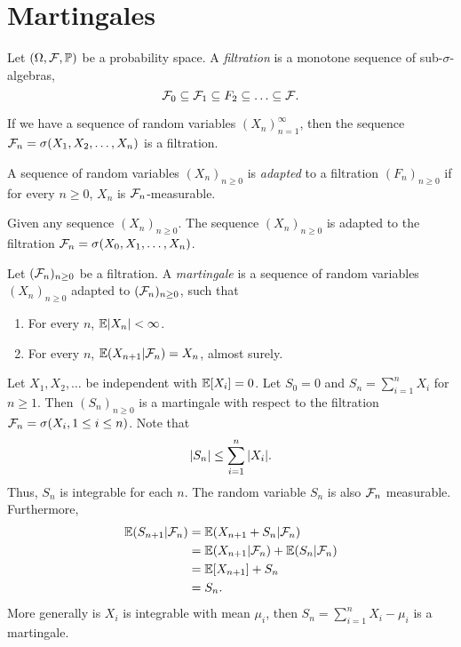 \section{Martingales}
\begin{definition}
    Let $({{\Omega}},{\mathcal{F}},{\mathbb{P}})$ be a probability space. A \emph{filtration} is a monotone sequence of sub-$\sigma$-algebras,
    \[{\mathcal{F}}_0 \subseteq {\mathcal{F}}_1 \subseteq F_2 \subseteq \ldots \subseteq {\mathcal{F}}.\]
\end{definition}
\begin{example}
    If we have a sequence of random variables $(X_n)_{n=1}^\infty$, then the sequence ${\mathcal{F}}_n = \sigma(X_1,X_2,\ldots, X_n)$ is a filtration.
\end{example}
\begin{definition}
    A sequence of random variables $(X_n)_{n \ge 0}$ is \emph{adapted} to a filtration $(F_n)_{n \ge 0}$ if for every $n \ge 0$, $X_n$ is ${\mathcal{F}}_n$-measurable.
\end{definition}
\begin{example}
   Given any sequence $(X_n)_{n \ge 0}$. The sequence $(X_n)_{n \ge 0}$ is adapted to the filtration ${\mathcal{F}}_n = \sigma(X_0,X_1,\ldots,X_n)$. 
\end{example}
\begin{definition}
    Let $({\mathcal{F}}_n)_{n \ge 0}$ be a filtration. A \emph{martingale} is a sequence of random variables $(X_n)_{n \ge 0}$ adapted to $({\mathcal{F}}_n)_{n \ge 0}$, such that
    \begin{enumerate}
        \item For every $n$, ${\mathbb{E}}{\left\lvert X_n\right\rvert} < \infty$.
        \item For every $n$, ${\mathbb{E}}(X_{n+1}|{\mathcal{F}}_n) = X_n$, almost surely.
    \end{enumerate}
\end{definition}
\begin{example}
    Let $X_1,X_2,\ldots$ be independent with ${\mathbb{E}}[X_i]=0$. Let $S_0=0$ and $S_n = \sum_{i=1}^nX_i$ for $n \ge 1$. Then $(S_n)_{n \ge 0}$ is a martingale with respect to the filtration ${\mathcal{F}}_n = \sigma(X_i, 1\le i \le n)$. Note that 
    \[{\left\lvert S_n\right\rvert} \le \sum_{i=1}^n {\left\lvert X_i\right\rvert}. \]
    Thus, $S_n$ is integrable for each $n$. The random variable $S_n$ is also ${\mathcal{F}}_n$ measurable. Furthermore,
    \begin{align*}
        {\mathbb{E}}(S_{n+1}|{\mathcal{F}}_n) &={\mathbb{E}}(X_{n+1}+S_n|{\mathcal{F}}_n)\\
        &={\mathbb{E}}(X_{n+1}|{\mathcal{F}}_n)+{\mathbb{E}}(S_n|{\mathcal{F}}_n)\\
        &={\mathbb{E}}[X_{n+1}]+S_n\\
        &=S_n.
    \end{align*}
    More generally is $X_i$ is integrable with mean $\mu_i$, then $S_n = \sum_{i=1}^n X_i-\mu_i$ is a martingale.
\end{example}
